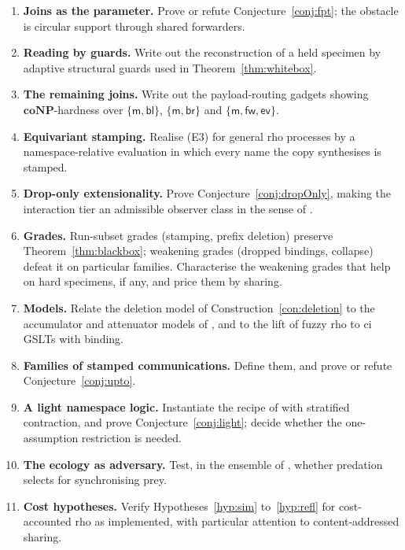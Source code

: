\documentclass[11pt]{article}
\theoremstyle{definition}
\theoremstyle{plain}
\theoremstyle{remark}
\newcommand{\coNP}{\mathbf{coNP}}
\newcommand{\cm}{\mathsf{m}}
\newcommand{\cfw}{\mathsf{fw}}
\newcommand{\cbl}{\mathsf{bl}}
\newcommand{\cbr}{\mathsf{br}}
\newcommand{\cev}{\mathsf{ev}}
\begin{document}
\begin{enumerate}[label=\arabic*.,leftmargin=2.2em]
\item \textbf{Joins as the parameter.} Prove or refute
Conjecture~\ref{conj:fpt}; the obstacle is circular support through
shared forwarders.
\item \textbf{Reading by guards.} Write out the reconstruction of a held
specimen by adaptive structural guards used in Theorem~\ref{thm:whitebox}.
\item \textbf{The remaining joins.} Write out the payload-routing gadgets
showing $\coNP$-hardness over $\{\cm, \cbl\}$, $\{\cm, \cbr\}$ and
$\{\cm, \cfw, \cev\}$.
\item \textbf{Equivariant stamping.} Realise (E3) for general rho
processes by a namespace-relative evaluation in which every name the copy
synthesises is stamped.
\item \textbf{Drop-only extensionality.} Prove
Conjecture~\ref{conj:dropOnly}, making the interaction tier an admissible
observer class in the sense of \cite{BIHOL}.
\item \textbf{Grades.} Run-subset grades (stamping, prefix deletion)
preserve Theorem~\ref{thm:blackbox}; weakening grades (dropped bindings,
collapse) defeat it on particular families. Characterise the weakening
grades that help on hard specimens, if any, and price them by sharing.
\item \textbf{Models.} Relate the deletion model of
Construction~\ref{con:deletion} to the accumulator and attenuator models
of \cite{FuzzyRho}, and to the lift of fuzzy rho to ci\,GSLTs with
binding.
\item \textbf{Families of stamped communications.} Define them, and prove
or refute Conjecture~\ref{conj:upto}.
\item \textbf{A light namespace logic.} Instantiate the recipe of
\cite{NamespaceLogic} with stratified contraction, and prove
Conjecture~\ref{conj:light}; decide whether the one-assumption restriction
is needed.
\item \textbf{The ecology as adversary.} Test, in the ensemble of
\cite{Scientist}, whether predation selects for synchronising prey.
\item \textbf{Cost hypotheses.} Verify Hypotheses~\ref{hyp:sim}
to~\ref{hyp:refl} for cost-accounted rho as implemented, with particular
attention to content-addressed sharing.
\end{enumerate}
\end{document}

